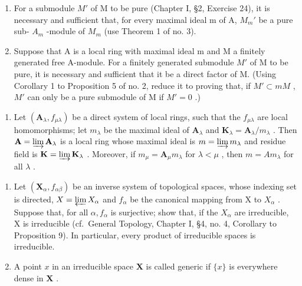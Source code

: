 \begin{enumerate}
\def\labelenumi{(\alph{enumi})}
\item
  For a submodule \(M'\) of M to be pure (Chapter I, §2, Exercise 24), it is necessary and sufficient that, for every maximal ideal m of A, \(M_{m}'\) be a pure sub- \(A_{m}\) -module of \(M_{m}\) (use Theorem 1 of no. 3).
\item
  Suppose that A is a local ring with maximal ideal m and M a finitely generated free A-module. For a finitely generated submodule \(M'\) of M to be pure, it is necessary and sufficient that it be a direct factor of M. (Using Corollary 1 to Proposition 5 of no. 2, reduce it to proving that, if \(M' \subset mM\) , \(M'\) can only be a pure submodule of M if \(M' = 0\) .)
\end{enumerate}

\begin{enumerate}
\def\labelenumi{\arabic{enumi}.}
\setcounter{enumi}{15}
\tightlist
\item
  Let \((\mathbf{A}_{\lambda}, f_{\mu \lambda})\) be a direct system of local rings, such that the \(f_{\mu \lambda}\) are local homomorphisms; let \(m_{\lambda}\) be the maximal ideal of \(\mathbf{A}_{\lambda}\) and \(\mathbf{K}_{\lambda} = \mathbf{A}_{\lambda} / m_{\lambda}\) . Then \(\mathbf{A} = \varinjlim \mathbf{A}_{\lambda}\) is a local ring whose maximal ideal is \(m = \varinjlim m_{\lambda}\) and residue field is \(\mathbf{K} = \varinjlim \mathbf{K}_{\lambda}\) . Moreover, if \(m_{\mu} = \mathbf{A}_{\mu} m_{\lambda}\) for \(\lambda < \mu\) , then \(m = Am_{\lambda}\) for all \(\lambda\) .
\end{enumerate}


\begin{enumerate}
\def\labelenumi{\arabic{enumi}.}
\item
  Let \((\mathbf{X}_{\alpha}, f_{\alpha\beta})\) be an inverse system of topological spaces, whose indexing set is directed, \(X = \varprojlim X_{\alpha}\) and \(f_{\alpha}\) be the canonical mapping from X to \(X_{\alpha}\) . Suppose that, for all \(\alpha, f_{\alpha}\) is surjective; show that, if the \(X_{\alpha}\) are irreducible, X is irreducible (cf.~General Topology, Chapter I, §4, no. 4, Corollary to Proposition 9). In particular, every product of irreducible spaces is irreducible.
\item
  A point \(x\) in an irreducible space \(\mathbf{X}\) is called generic if \(\{x\}\) is everywhere dense in \(\mathbf{X}\) .
\end{enumerate}


